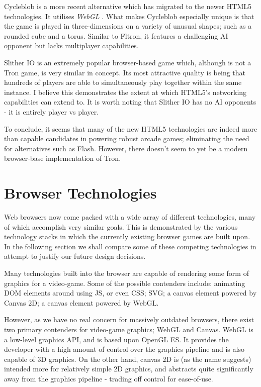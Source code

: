 \documentclass[class=article, crop=false]{standalone}
\begin{document}
		Cycleblob \parencite{Cycleblob} is a more recent alternative which has migrated to the newer HTML5 technologies. It utilises \emph{WebGL} \parencite{WebGl}. What makes Cycleblob especially unique is that the game is played in three-dimensions on a variety of unusual shapes; such as a rounded cube and a torus. Similar to Fltron, it features a challenging AI opponent but lacks multiplayer capabilities.

		Slither IO \parencite{SlitherIo} is an extremely popular browser-based game which, although is not a Tron game, is very similar in concept. Its most attractive quality is being that hundreds of players are able to simultaneously play together within the same instance. I believe this demonstrates the extent at which HTML5's networking capabilities can extend to. It is worth noting that Slither IO has no AI opponents - it is entirely player vs player.

		To conclude, it seems that many of the new HTML5 technologies are indeed more than capable candidates in powering robust arcade games; eliminating the need for alternatives such as Flash. However, there doesn't seem to yet be a modern browser-base implementation of Tron.

	\section{Browser Technologies}
		Web browsers now come packed with a wide array of different technologies, many of which accomplish very similar goals. This is demonstrated by the various technology stacks in which the currently existing browser games are built upon. In the following section we shall compare some of these competing technologies in attempt to justify our future design decisions.

		Many technologies built into the browser are capable of rendering some form of graphics for a video-game. Some of the possible contenders include: animating DOM elements around using JS, or even CSS; SVG; a canvas element powered by Canvas 2D; a canvas element powered by WebGL.

		However, as we have no real concern for massively outdated browsers, there exist two primary contenders for video-game graphics; WebGL and Canvas. WebGL is a low-level graphics API, and is based upon OpenGL ES. It provides the developer with a high amount of control over the graphics pipeline and is also capable of 3D graphics. On the other hand, canvas 2D is (as the name suggests) intended more for relatively simple 2D graphics, and abstracts quite significantly away from the graphics pipeline - trading off control for ease-of-use.
\end{document}
